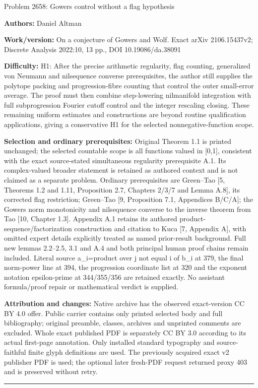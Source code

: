 \documentclass[10pt]{article}
\begin{document}
\begin{center}\Large Problem 2658: Gowers control without a flag hypothesis\end{center}
\noindent\textbf{Authors:} Daniel Altman\par
\noindent\textbf{Work/version:} On a conjecture of Gowers and Wolf. Exact arXiv 2106.15437v2; Discrete Analysis 2022:10, 13 pp., DOI 10.19086/da.38091\par
\noindent\textbf{Difficulty:} H1: After the precise arithmetic regularity, flag counting, generalized von Neumann and nilsequence converse prerequisites, the author still supplies the polytope packing and progression-fibre counting that control the outer small-error average. The proof must then combine step-lowering nilmanifold integration with full subprogression Fourier cutoff control and the integer rescaling closing. These remaining uniform estimates and constructions are beyond routine qualification applications, giving a conservative H1 for the selected nonnegative-function scope.\par
\noindent\textbf{Selection and ordinary prerequisites:} Original Theorem 1.1 is printed unchanged; the selected countable scope is all functions valued in [0,1], consistent with the exact source-stated simultaneous regularity prerequisite A.1. Its complex-valued broader statement is retained as authored context and is not claimed as a separate problem. Ordinary prerequisites are Green--Tao [5, Theorems 1.2 and 1.11, Proposition 2.7, Chapters 2/3/7 and Lemma A.8], its corrected flag restriction; Green--Tao [9, Proposition 7.1, Appendices B/C/A]; the Gowers norm monotonicity and nilsequence converse to the inverse theorem from Tao [10, Chapter 1.3]. Appendix A.1 retains its authored product-sequence/factorization construction and citation to Kuca [7, Appendix A], with omitted expert details explicitly treated as named prior-result background. Full new lemmas 2.2--2.5, 3.1 and A.4 and both principal human proof chains remain included. Literal source a\_i=product over j not equal i of b\_i at 379, the final norm-power line at 394, the progression coordinate list at 320 and the exponent notation epsilon-prime at 344/355/356 are retained exactly. No assistant formula/proof repair or mathematical verdict is supplied.\par
\noindent\textbf{Attribution and changes:} Native archive has the observed exact-version CC BY 4.0 offer. Public carrier contains only printed selected body and full bibliography; original preamble, classes, archives and unprinted comments are excluded. Whole exact published PDF is separately CC BY 3.0 according to its actual first-page annotation. Only installed standard typography and source-faithful finite glyph definitions are used. The previously acquired exact v2 publisher PDF is used; the optional later fresh-PDF request returned proxy 403 and is preserved without retry.\par
\medskip\hrule\medskip
\end{document}
